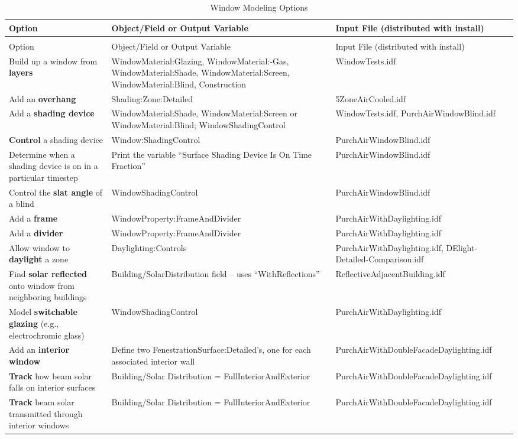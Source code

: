 \begin{longtable}[c]{p{2.0in}p{2.0in}p{2.0in}}
\caption{Window Modeling Options \label{table:window-modeling-options}} \tabularnewline
\toprule
Option & Object/Field or Output Variable & Input File (distributed with install) \tabularnewline
\midrule
\endfirsthead

\caption[]{Window Modeling Options} \tabularnewline
\toprule
Option & Object/Field or Output Variable & Input File (distributed with install) \tabularnewline
\midrule
\endhead

Build up a window from \textbf{layers} & Window\-Material:\-Glazing, Window\-Material:-Gas, Window\-Material:\-Shade, Window\-Material:\-Screen, Window\-Material:\-Blind, Construction & Window\-Tests.idf \tabularnewline
Add an \textbf{overhang} & Shading:\-Zone:\-Detailed & 5Zone\-Air\-Cooled.idf \tabularnewline
Add a \textbf{shading device} & Window\-Material:\-Shade, Window\-Material:\-Screen or Window\-Material:\-Blind; Window\-Shading\-Control & Window\-Tests.idf, Purch\-Air\-Window\-Blind.idf \tabularnewline
\textbf{Control} a shading device & Window:\-Shading\-Control & Purch\-Air\-WindowBlind.idf \tabularnewline
Determine when a shading device is on in a particular timestep & Print the variable ``Surface Shading Device Is On Time Fraction'' & Purch\-Air\-Window\-Blind.idf \tabularnewline
Control the \textbf{slat angle} of a blind & Window\-Shading\-Control & Purch\-Air\-Window\-Blind.idf \tabularnewline
Add a \textbf{frame} & Window\-Property:\-FrameAndDivider & Purch\-Air\-With\-Day\-lighting.idf \tabularnewline
Add a \textbf{divider} & Window\-Property:\-Frame\-And\-Divider & Purch\-Air\-With\-Day\-lighting.idf \tabularnewline
Allow window to \textbf{daylight} a zone & Day\-lighting:Controls & Purch\-Air\-With\-Day\-lighting.idf, DElight-\-Detailed-\-Comparison.idf \tabularnewline
Find \textbf{solar reflected} onto window from neighboring buildings & Building/\-Solar\-Distribution field – uses ``WithReflections'' & Reflective\-Adjacent\-Building.idf \tabularnewline
Model \textbf{switchable glazing} (e.g., electrochromic glass) & Window\-Shading\-Control & Purch\-Air\-With\-Day\-lighting.idf \tabularnewline
Add an \textbf{interior window} & Define two Fenestration\-Surface:\-Detailed's, one for each associated interior wall & Purch\-Air\-With\-Double\-Facade\-Day\-lighting.idf \tabularnewline
\textbf{Track} how beam solar falls on interior surfaces & Building/\-Solar Distribution = Full\-Interior\-And\-Exterior & Purch\-Air\-With\-Double\-Facade\-Day\-lighting.idf \tabularnewline
\textbf{Track} beam solar transmitted through interior windows & Building/Solar Distribution = Full\-Interior\-And\-Exterior & Purch\-Air\-With\-Double\-Facade\-Day\-lighting.idf \tabularnewline

\end{longtable}
